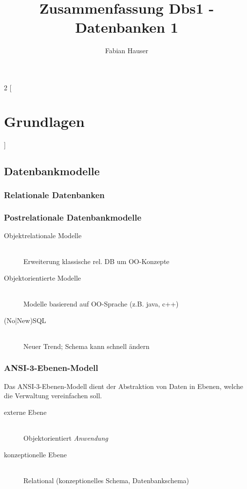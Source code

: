 

\title{Zusammenfassung Dbs1 - Datenbanken 1}
\author{Fabian Hauser}
 

\maketitle
\begin{multicols}{2}
[
\section{Grundlagen}
]
\subsection{Datenbankmodelle}


\subsubsection{Relationale Datenbanken}


\subsubsection{Postrelationale Datenbankmodelle}
	\begin{description}
		\item[Objektrelationale Modelle] \hfill \\ Erweiterung klassische rel. DB um OO-Konzepte
		\item[Objektorientierte Modelle] \hfill \\ Modelle basierend auf OO-Sprache (z.B. java, c++)
		\item[(No|New)SQL] \hfill \\ Neuer Trend; Schema kann schnell ändern
	\end{description}

\subsubsection{ANSI-3-Ebenen-Modell}
	Das ANSI-3-Ebenen-Modell dient der Abstraktion von Daten in Ebenen, welche die Verwaltung vereinfachen soll.
	\begin{description}
		\item[externe Ebene] \hfill \\
			Objektorientiert \emph{Anwendung}
			
		\item[konzeptionelle Ebene] \hfill \\
			Relational (konzeptionelles Schema, Datenbankschema)
			

\end{description}
\end{multicols}
